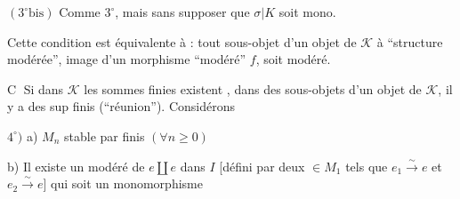 $(3^\circ\text{bis})$ Comme $3^\circ$, mais sans supposer que $\sigma|K$ soit mono.

Cette condition est équivalente à : tout sous-objet d'un objet de $\mathcal K$ à ``structure modérée'', image d'un morphisme ``modéré'' $f$, soit modéré.


\textcircled{C} Si dans $\mathcal K$ les sommes finies existent , dans  des sous-objets d'un objet de $\mathcal K$, il y a des sup finis (``réunion''). Considérons

$4^\circ)$ a) $M_n$ stable par   finis $(\forall n\geq0)$ \deleted{$\unsure{\varnothing}$}

b) Il existe un  modéré de  $e\amalg e$ dans $I$ [défini par deux  $\in M_1$ tels que $e_1\overset{\sim}{\to}e$ et $e_2\overset{\sim}{\to}e$] qui soit un monomorphisme

